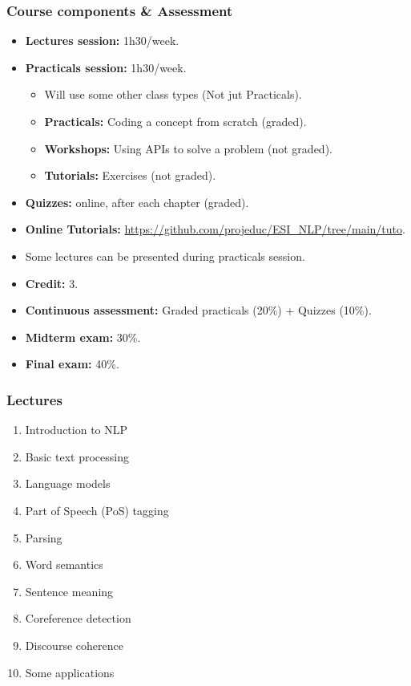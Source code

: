 \documentclass{beamer}
\begin{document}
\begin{frame}
\frametitle{Course components \& Assessment}

\begin{itemize}
	\item \textbf{Lectures session:} 1h30/week.
	\item \textbf{Practicals session:} 1h30/week.
	\begin{itemize}
		\item Will use some other class types (Not jut Practicals).
		\item \textbf{Practicals:} Coding a concept from scratch (graded).
		\item \textbf{Workshops:} Using APIs to solve a problem (not graded).
		\item \textbf{Tutorials:} Exercises (not graded).
	\end{itemize}
	\item \textbf{Quizzes:} online, after each chapter (graded).
	\item \textbf{Online Tutorials:} {\scriptsize\url{https://github.com/projeduc/ESI_NLP/tree/main/tuto}}.
	\item Some lectures can be presented during practicals session.
\end{itemize}

\vfill

\begin{itemize}
	\item \textbf{Credit:} 3.
	\item \textbf{Continuous assessment:} Graded practicals (20\%) + Quizzes (10\%).
	\item \textbf{Midterm exam:} 30\%.
	\item \textbf{Final exam:} 40\%.
\end{itemize}

\end{frame}

\begin{frame}
\frametitle{Lectures}

\begin{enumerate}
	\item Introduction to NLP
	\item Basic text processing
	\item Language models
	\item Part of Speech (PoS) tagging
	\item Parsing
	\item Word semantics
	\item Sentence meaning
	\item Coreference detection
	\item Discourse coherence
	\item Some applications
\end{enumerate}

\end{frame}
\end{document}
